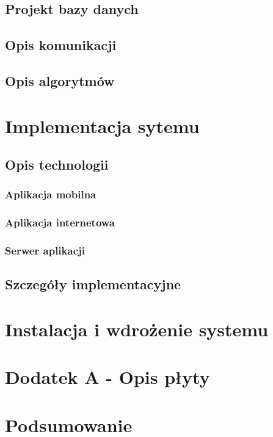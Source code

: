 \documentclass[10pt,titlepage]{article}
\begin{document}
\subsection{Projekt bazy danych}

\subsection{Opis komunikacji}

\subsection{Opis algorytmów}


\section{Implementacja sytemu}

\subsection{Opis technologii}
\subsubsection{Aplikacja mobilna}
\subsubsection{Aplikacja internetowa}
\subsubsection{Serwer aplikacji}
\subsection{Szczegóły implementacyjne}

\section{Instalacja i wdrożenie systemu}

\section{Dodatek A - Opis płyty}

\section*{Podsumowanie}




\end{document}
